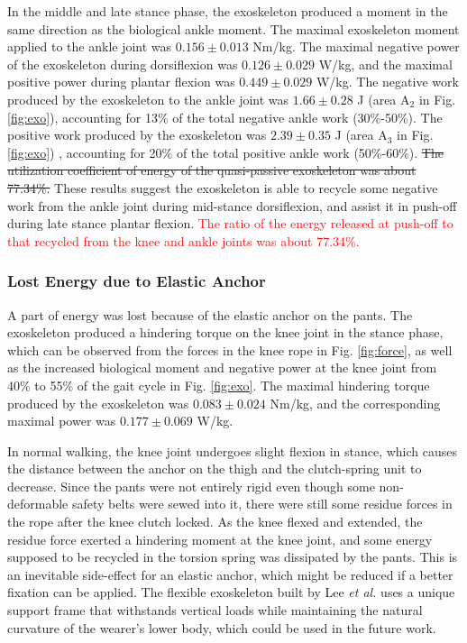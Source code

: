 \documentclass[twocolumn,cleanfoot,10pt]{asme2ej}
\begin{document}
In the middle and late stance phase, the exoskeleton produced a moment in the same direction as the biological ankle moment.
The maximal exoskeleton moment applied to the ankle joint was $0.156\pm0.013$ Nm/kg.
The maximal negative power of the exoskeleton during dorsiflexion was $0.126\pm0.029$ W/kg, and the maximal positive power during plantar flexion was $0.449\pm0.029$ W/kg.
The negative work produced by the exoskeleton to the ankle joint was $1.66\pm0.28$ J (area A$_{2}$ in Fig. \ref{fig:exo}), accounting for 13\% of the total negative ankle work (30\%-50\%).
The positive work produced by the exoskeleton was $2.39\pm0.35$ J (area A$_{3}$ in Fig. \ref{fig:exo}) , accounting for 20\% of the total positive ankle work (50\%-60\%).
\sout{The utilization coefficient of energy of the quasi-passive exoskeleton was about 77.34\%.}
These results suggest the exoskeleton is able to recycle some negative work from the ankle joint during mid-stance dorsiflexion, and assist it in push-off during late stance plantar flexion.
\textcolor{red}{The ratio of the energy released at push-off to that recycled from the knee and ankle joints was about 77.34\%.}

\subsubsection{Lost Energy due to Elastic Anchor}
A part of energy was lost because of the elastic anchor on the pants.
The exoskeleton produced a hindering torque on the knee joint in the stance phase, which can be observed from the forces in the knee rope in Fig. \ref{fig:force}, as well as the increased biological moment and negative power at the knee joint from 40\% to 55\% of the gait cycle in Fig. \ref{fig:exo}. 
The maximal hindering torque produced by the exoskeleton was $0.083\pm0.024$ Nm/kg, and the corresponding maximal power was $0.177\pm0.069$ W/kg.

In normal walking, the knee joint undergoes slight flexion in stance, which causes the distance between the anchor on the thigh and the clutch-spring unit to decrease.
Since the pants were not entirely rigid even though some non-deformable safety belts were sewed into it, there were still some residue forces in the rope after the knee clutch locked.
As the knee flexed and extended, the residue force exerted a hindering moment at the knee joint, and some energy supposed to be recycled in the torsion spring was dissipated by the pants.
This is an inevitable side-effect for an elastic anchor, which might be reduced if a better fixation can be applied.
The flexible exoskeleton built by Lee \emph{et al.} \cite{exosuit} uses a unique support frame that withstands vertical loads while maintaining the natural curvature of the wearer's lower body, which could be used in the future work.
\end{document}
